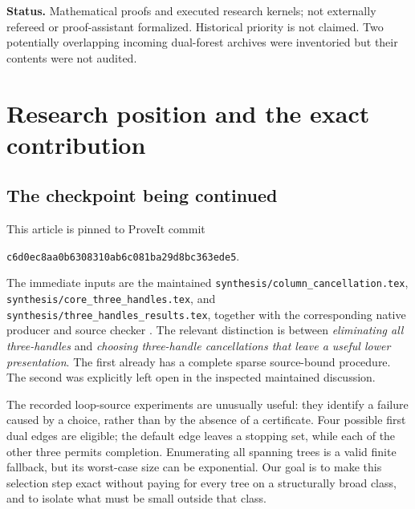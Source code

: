 \documentclass[11pt,letterpaper]{article}
\theoremstyle{definition}
\theoremstyle{remark}
\newcommand{\code}[1]{\nolinkurl{#1}}
\newcommand{\pin}{\texttt{c6d0ec8aa0b6308310ab6c081ba29d8bc363ede5}}
\begin{document}
\begin{titlepage}
\begin{abstract}
The package includes conventional proofs, an independent certificate verifier, 54 passing unit tests, exhaustive and randomized comparisons, a reconstruction of the repository's five-row loop example, and a source-replay integration seam. These are local selection results, not a general quasi-polynomial unknot recognizer. The hardness construction is not asserted to be geometrically realizable, and full native geometry and recognition were not executed in this study.
\end{abstract}
\vfill
{\small\textbf{Status.} Mathematical proofs and executed research kernels; not externally refereed or proof-assistant formalized. Historical priority is not claimed. Two potentially overlapping incoming dual-forest archives were inventoried but their contents were not audited.}\par
\end{titlepage}
\hypersetup{pageanchor=true}
\begingroup
\fontsize{9.5}{10.8}\selectfont
\setlength{\parskip}{0pt}
\tableofcontents
\endgroup
\clearpage
{}

\section{Research position and the exact contribution}\label{sec:position}
\subsection{The checkpoint being continued}
This article is pinned to ProveIt commit
\begin{center}\small\pin.\end{center}
The immediate inputs are the maintained \code{synthesis/column_cancellation.tex},
\code{synthesis/core_three_handles.tex}, and
\code{synthesis/three_handles_results.tex}, together with the corresponding native producer and source checker \cite{repo-peeling,repo-dual,repo-results,repo-native,repo-checker}.
The relevant distinction is between \emph{eliminating all three-handles} and
\emph{choosing three-handle cancellations that leave a useful lower presentation}.
The first already has a complete sparse source-bound procedure. The second was
explicitly left open in the inspected maintained discussion.

The recorded loop-source experiments are unusually useful: they identify a failure
caused by a choice, rather than by the absence of a certificate. Four possible
first dual edges are eligible; the default edge leaves a stopping set, while each
of the other three permits completion. Enumerating all spanning trees is a valid
finite fallback, but its worst-case size can be exponential. Our goal is to make
this selection step exact without paying for every tree on a structurally broad
class, and to isolate what must be small outside that class.
\end{document}
